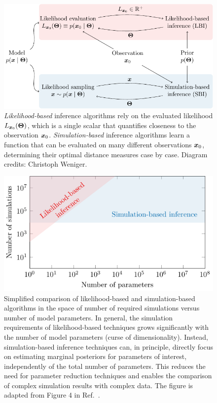 \begin{figure}
	\centering
	\includegraphics[width=\linewidth]{TikZ/lbi_vs_sbi.pdf}
	\caption{\emph{Likelihood-based} inference algorithms rely on the evaluated likelihood  $L_{\bm{x}_0}(\bm{\Theta}) $, which is a single scalar that quantifies closeness to the observation $\bm{x}_0$. \emph{Simulation-based} inference algorithms learn a function that can be evaluated on many different observations $\bm{x}_0$, determining their optimal distance measures case by case. Diagram credits: Christoph Weniger.}
	\label{fig:SBIvsLBI}
\end{figure}

\begin{figure}
    \centering
    \includegraphics[width=0.9\linewidth]{TikZ/curse_of_dim.pdf}
	\caption{Simplified comparison of likelihood-based and simulation-based algorithms in the space of number of required simulations versus number of model parameters. In general, the simulation requirements of likelihood-based techniques grows significantly with the number of model parameters (curse of dimensionality). Instead, simulation-based inference techniques can, in principle, directly focus on estimating marginal posteriors for parameters of interest, independently of the total number of parameters. This reduces the need for parameter reduction techniques and enables the comparison of complex simulation results with complex data. The figure is adapted from Figure 4 in Ref.~\cite{Boddy:2022knd}.}
    \label{fig:sbi-lbi-cost}
\end{figure}
 
